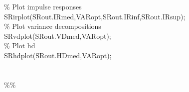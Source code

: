 \hspace{1mm}\hspace{5mm} \hspace{5mm} \hspace{5mm} \textcolor{matlabgreen}{\% Plot impulse responses }\\ 
\hspace{1mm}\hspace{5mm} \hspace{5mm} \hspace{5mm} SRirplot(SRout.IRmed,VARopt,SRout.IRinf,SRout.IRsup); \\ 
\hspace{1mm}\hspace{5mm} \hspace{5mm} \hspace{5mm} \textcolor{matlabgreen}{\% Plot variance decompositions }\\ 
\hspace{1mm}\hspace{5mm} \hspace{5mm} \hspace{5mm} SRvdplot(SRout.VDmed,VARopt); \\ 
\hspace{1mm}\hspace{5mm} \hspace{5mm} \hspace{5mm} \textcolor{matlabgreen}{\% Plot hd }\\ 
\hspace{1mm}\hspace{5mm} \hspace{5mm} \hspace{5mm} SRhdplot(SRout.HDmed,VARopt); \\ 
\hspace{1mm}\hspace{5mm} \hspace{5mm} \hspace{5mm}  \\ 
\hspace{1mm}\hspace{5mm} \hspace{5mm} \hspace{5mm}  \\ 
\hspace{1mm}\hspace{5mm} \hspace{5mm} \hspace{5mm} \textcolor{matlabgreen}{\%}\textcolor{matlabgreen}{\% }\\ 
